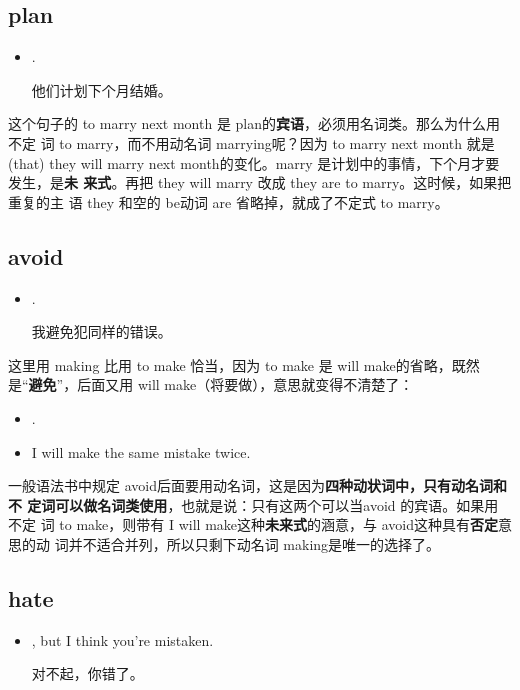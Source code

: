 \subsection{plan}

\begin{itemize}
\item  {}  .

  他们计划下个月结婚。
\end{itemize}

这个句子的 to marry next month 是 plan的\textbf{宾语}，必须用名词类。那么为什么用不定
词 to marry，而不用动名词 marrying呢？因为 to marry next month 就是 (that)
they will marry next month的变化。marry 是计划中的事情，下个月才要发生，是\textbf{未
  来式}。再把 they will marry 改成 they are to marry。这时候，如果把重复的主
语 they 和空的 be动词 are 省略掉，就成了不定式 to marry。

\subsection{avoid}

\begin{itemize}
\item  {}  .

  我避免犯同样的错误。
\end{itemize}

这里用 making 比用 to make 恰当，因为 to make 是 will make的省略，既然
是“\textbf{避免}”，后面又用 will make（将要做），意思就变得不清楚了：

\begin{itemize}
\item  {}  .
\item  I will make the same mistake twice.
\end{itemize}

一般语法书中规定 avoid后面要用动名词，这是因为\textbf{四种动状词中，只有动名词和不
  定词可以做名词类使用}，也就是说：只有这两个可以当avoid 的宾语。如果用不定
词 to make，则带有 I will make这种\textbf{未来式}的涵意，与 avoid这种具有\textbf{否定}意思的动
词并不适合并列，所以只剩下动名词 making是唯一的选择了。

\subsection{hate}

\begin{itemize}
\item  {}  , but I think you're
  mistaken.

  对不起，你错了。
\end{itemize}

